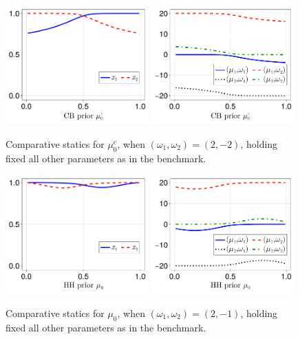 \documentclass[12pt,a4paper]{article}
\begin{document}
\begin{figure}[H]
\centering
\includegraphics[width=0.49\textwidth]{figures/V8/γ_10/fig_optimal_π_across_μ_0_c_ω_1_2_ω_2_-2_δ_0.5_.pdf}
\includegraphics[width=0.49\textwidth]{figures/V8/γ_10/fig_posterior_across_μ_0_c_ω_1_2_ω_2_-2_δ_0.5_.pdf}
\caption{Comparative statics for $\mu_0^c$, when $(\omega_1,\omega_2)=(2,-2)$, holding fixed all other parameters as in the benchmark.}
\label{FigureA6}
\end{figure}

\begin{figure}[H]
\centering
\includegraphics[width=0.49\textwidth]{figures/V8/γ_10/fig_optimal_π_across_μ_0_ω_1_2_ω_2_-1_δ_0.5_.pdf}
\includegraphics[width=0.49\textwidth]{figures/V8/γ_10/fig_posterior_across_μ_0_ω_1_2_ω_2_-1_δ_0.5_.pdf}
\caption{Comparative statics for $\mu_0$, when $(\omega_1,\omega_2)=(2,-1)$, holding fixed all other parameters as in the benchmark.}
\label{FigureA7}
\end{figure}
\end{document}

